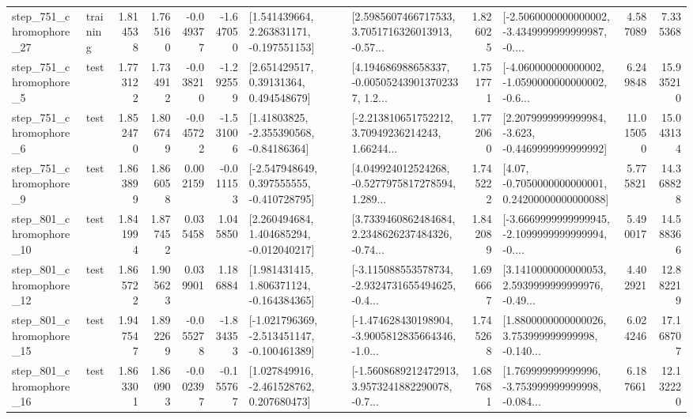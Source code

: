 \begin{tabular}{llrrrrllrlrr}
  step\_751\_chromophore\_27 &  training &      1.814538 &    1.765160 &     -0.049377 & -1.647050 &    [1.541439664, 2.263831171, -0.197551153] &  [2.5985607466717533, 3.7051716326013913, -0.57... &       1.826025 &  [-2.5060000000000002, -3.4349999999999987, -0.... &            4.587089 &          7.335368 \\
   step\_751\_chromophore\_5 &      test &      1.773122 &    1.734912 &     -0.038210 & -1.292559 &      [2.651429517, 0.39131364, 0.494548679] &  [4.194686988658337, -0.005052439013702337, 1.2... &       1.751771 &  [-4.060000000000002, -1.0590000000000002, -0.6... &            6.249848 &         15.935210 \\
   step\_751\_chromophore\_6 &      test &      1.852470 &    1.806749 &     -0.045722 & -1.531006 &     [1.41803825, -2.355390568, -0.84186364] &  [-2.213810651752212, 3.70949236214243, 1.66244... &       1.772060 &  [2.2079999999999984, -3.623, -0.4469999999999992] &           11.015050 &         15.043134 \\
   step\_751\_chromophore\_9 &      test &      1.863899 &    1.866058 &      0.002159 & -0.011153 &   [-2.547948649, 0.397555555, -0.410728795] &  [4.049924012524268, -0.5277975817278594, 1.289... &       1.745222 &   [4.07, -0.7050000000000001, 0.24200000000000088] &            5.775821 &         14.368828 \\
  step\_801\_chromophore\_10 &      test &      1.841994 &    1.877452 &      0.035458 &  1.045850 &    [2.260494684, 1.404685294, -0.012040217] &  [3.7339460862484684, 2.2348626237484326, -0.74... &       1.842089 &  [-3.6669999999999945, -2.1099999999999994, -0.... &            5.490017 &         14.588366 \\
  step\_801\_chromophore\_12 &      test &      1.865722 &    1.905623 &      0.039901 &  1.186884 &    [1.981431415, 1.806371124, -0.164384365] &  [-3.115088553578734, -2.9324731655494625, -0.4... &       1.696667 &  [3.1410000000000053, 2.5939999999999976, -0.49... &            4.402921 &         12.882219 \\
  step\_801\_chromophore\_15 &      test &      1.947547 &    1.892269 &     -0.055278 & -1.834353 &  [-1.021796369, -2.513451147, -0.100461389] &  [-1.474628430198904, -3.9005812835664346, -1.0... &       1.745268 &  [1.8800000000000026, 3.753999999999998, -0.140... &            6.024246 &         17.168707 \\
  step\_801\_chromophore\_16 &      test &      1.863301 &    1.860903 &     -0.002397 & -0.155767 &    [1.027849916, -2.461528762, 0.207680473] &  [-1.5608689212472913, 3.9573241882290078, -0.7... &       1.687681 &  [1.769999999999996, -3.753999999999998, -0.084... &            6.187661 &         12.132220 \\

\end{tabular}
